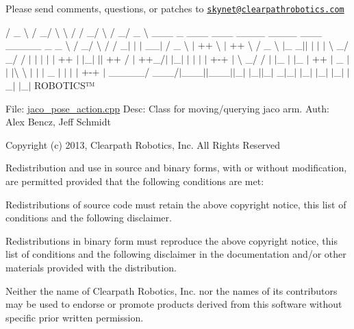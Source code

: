 Please send comments, questions, or patches to \href{mailto:skynet@clearpathrobotics.com}{\tt skynet@clearpathrobotics.\+com}



 / \+\_\+ \textbackslash{} / \+\_\+/ \textbackslash{} \textbackslash{} / / \+\_\+/ \textbackslash{} / \+\_\+/ \+\_\+ \textbackslash{} \+\_\+\+\_\+\+\_\+ \+\_\+ \+\_\+\+\_\+\+\_\+ \+\_\+\+\_\+\+\_\+ \+\_\+\+\_\+\+\_\+\+\_\+ \+\_\+\+\_\+\+\_\+\+\_\+ \+\_\+\+\_\+\+\_\+ \+\_\+\+\_\+\+\_\+\+\_\+\+\_\+ \+\_\+ \+\_\+ \textbackslash{} / \+\_\+/ \textbackslash{} / / \+\_\+$|$ $\vert$ $\vert$ \+\_\+\+\_\+$\vert$ / \+\_\+ \textbackslash{} $\vert$ ++ \textbackslash{} $\vert$ ++ \textbackslash{} / \+\_\+ \textbackslash{} $\vert$\+\_\+ \+\_\+$\vert$$\vert$ $\vert$ $\vert$ $\vert$ \textbackslash{} \+\_\+/ \+\_\+/ / $\vert$ $\vert$ $\vert$ $\vert$ $\vert$ ++ $\vert$ $\vert$\+\_\+$\vert$ $\vert$$\vert$ ++ / $\vert$ ++\+\_\+/$\vert$ $\vert$\+\_\+$\vert$ $\vert$ $\vert$ $\vert$ $\vert$ +-\/+ $\vert$ \textbackslash{} \+\_\+/ / $\vert$ $\vert$\+\_\+ $\vert$ $\vert$\+\_\+ $\vert$ ++ $\vert$ \+\_\+ $\vert$$\vert$ $\vert$\textbackslash{} \textbackslash{} $\vert$ $\vert$ $\vert$ \+\_\+ $\vert$ $\vert$ $\vert$ $\vert$ +-\/+ $\vert$ \+\_\+\+\_\+\+\_\+\+\_\+\+\_\+/ \+\_\+\+\_\+\+\_\+/$\vert$\+\_\+\+\_\+\+\_\+$\vert$$\vert$\+\_\+\+\_\+\+\_\+$\vert$$\vert$\+\_\+$\vert$ $\vert$\+\_\+$\vert$$\vert$\+\_\+$\vert$ \+\_\+$|$\+\_\+$\vert$ $\vert$\+\_\+$\vert$ $\vert$\+\_\+$\vert$ $\vert$\+\_\+$\vert$ $\vert$\+\_\+$\vert$ $\vert$\+\_\+$\vert$ R\+O\+B\+O\+T\+I\+C\+S™

File\+: \hyperlink{jaco__pose__action_8cpp}{jaco\+\_\+pose\+\_\+action.\+cpp} Desc\+: Class for moving/querying jaco arm. Auth\+: Alex Bencz, Jeff Schmidt

Copyright (c) 2013, Clearpath Robotics, Inc. All Rights Reserved

Redistribution and use in source and binary forms, with or without modification, are permitted provided that the following conditions are met\+:
\begin{DoxyItemize}
\item Redistributions of source code must retain the above copyright notice, this list of conditions and the following disclaimer.
\item Redistributions in binary form must reproduce the above copyright notice, this list of conditions and the following disclaimer in the documentation and/or other materials provided with the distribution.
\item Neither the name of Clearpath Robotics, Inc. nor the names of its contributors may be used to endorse or promote products derived from this software without specific prior written permission.
\end{DoxyItemize}

